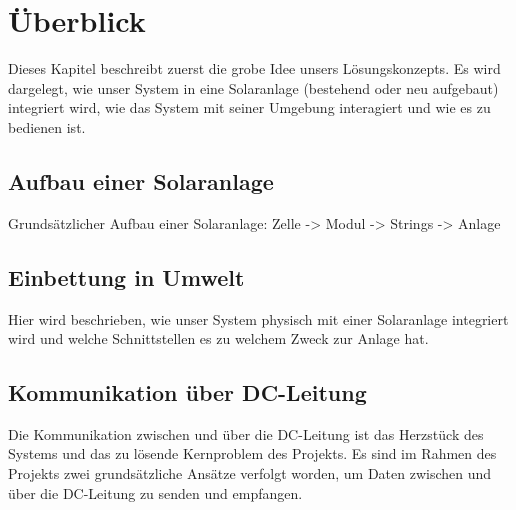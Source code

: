 \chapter{\"Uberblick}
\label{chap:uberblick}
Dieses Kapitel  beschreibt zuerst die grobe  Idee unsers L\"osungskonzepts. Es
wird  dargelegt, wie  unser System  in  eine Solaranlage  (bestehend oder  neu
aufgebaut) integriert wird, wie das System mit seiner Umgebung interagiert und
wie es zu bedienen ist.


\section{Aufbau einer Solaranlage}
\label{sec:solaranlage:aufbau}

Grunds\"atzlicher Aufbau einer Solaranlage: Zelle -> Modul -> Strings -> Anlage


\section{Einbettung in Umwelt}
\label{sec:einbettung}

Hier  wird  beschrieben,  wie  unser System  physisch  mit  einer  Solaranlage
integriert wird und welche Schnittstellen es zu welchem Zweck zur Anlage hat.


\clearpage
\section{Kommunikation \"uber DC-Leitung}
\label{sec:commDCLine}

Die Kommunikation zwischen  \Sensor und \Master \"uber die  DC-Leitung ist das
Herzst\"uck des Systems und das zu l\"osende Kernproblem des Projekts. Es sind
im Rahmen  des Projekts  zwei grunds\"atzliche  Ans\"atze verfolgt  worden, um
Daten  zwischen  \Sensor und  \Master  \"uber  die  DC-Leitung zu  senden  und
empfangen.

